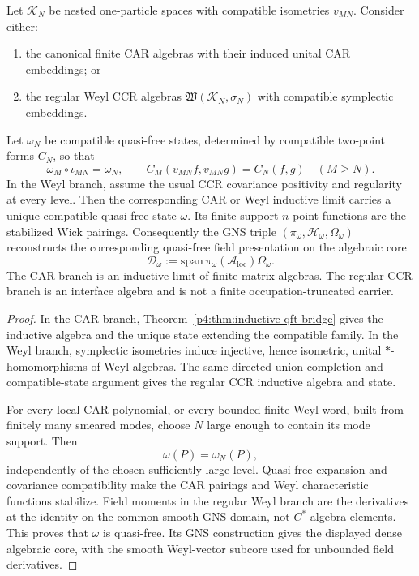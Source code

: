 \documentclass[12pt,a4paper]{article}
\begin{document}
\begin{theorem}
\label{p4:thm:quasifree-reconstruction}
Let \(\mathcal K_N\) be nested one-particle spaces with compatible
isometries \(v_{MN}\).  Consider either:
\begin{enumerate}[label=(\alph*), leftmargin=2em]
\item the canonical finite CAR algebras with their induced unital CAR
embeddings; or
\item the regular Weyl CCR algebras
\(\mathfrak W(\mathcal K_N,\sigma_N)\) with compatible symplectic
embeddings.
\end{enumerate}
Let \(\omega_N\) be compatible quasi-free states, determined by compatible
two-point forms \(C_N\), so that
\[
\omega_M\circ\iota_{MN}=\omega_N,
\qquad
C_M(v_{MN}f,v_{MN}g)=C_N(f,g)
\quad(M\ge N).
\]
In the Weyl branch, assume the usual CCR covariance positivity and
regularity at every level.  Then the corresponding CAR or Weyl inductive
limit carries a unique compatible quasi-free state \(\omega\).  Its
finite-support \(n\)-point functions are the stabilized Wick pairings.
Consequently the GNS triple
\((\pi_\omega,\mathcal H_\omega,\Omega_\omega)\) reconstructs the
corresponding quasi-free field presentation on the algebraic core
\[
\mathcal D_\omega:=
\mathrm{span}\,\pi_\omega(\mathcal A_{\mathrm{loc}})\Omega_\omega.
\]
The CAR branch is an inductive limit of finite matrix algebras.  The regular
CCR branch is an interface algebra and is not a finite
occupation-truncated carrier.
\end{theorem}

\begin{proof}
In the CAR branch,
Theorem~\ref{p4:thm:inductive-qft-bridge} gives the inductive algebra and
the unique state extending the compatible family.  In the Weyl branch,
symplectic isometries induce injective, hence isometric, unital
\(*\)-homomorphisms of Weyl algebras.  The same directed-union completion
and compatible-state argument gives the regular CCR inductive algebra and
state.

For every local CAR polynomial, or every bounded finite Weyl word, built
from finitely many smeared modes, choose \(N\) large enough to contain its
mode support.  Then
\[
\omega(P)=\omega_N(P),
\]
independently of the chosen sufficiently large level.  Quasi-free expansion
and covariance compatibility make the CAR pairings and Weyl characteristic
functions stabilize.  Field moments in the regular Weyl branch are the
derivatives at the identity on the common smooth GNS domain, not
\(C^*\)-algebra elements.  This proves that \(\omega\) is quasi-free.  Its
GNS construction gives the displayed dense algebraic core, with the smooth
Weyl-vector subcore used for unbounded field derivatives. \qedhere
\end{proof}
\end{document}
